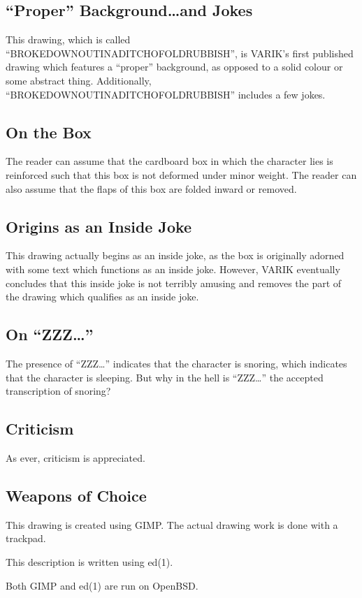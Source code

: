 \documentclass{report}
\begin{document}
\subsection{``Proper'' Background\ldots and Jokes}
This drawing, which is called ``BROKEDOWNOUTINADITCHOFOLDRUBBISH'', is VARIK's first published drawing which features a ``proper'' background, as opposed to a solid colour or some abstract thing.  Additionally, ``BROKEDOWNOUTINADITCHOFOLDRUBBISH'' includes a few jokes.

\subsection{On the Box}
The reader can assume that the cardboard box in which the character lies is reinforced such that this box is not deformed under minor weight.  The reader can also assume that the flaps of this box are folded inward or removed.

\subsection{Origins as an Inside Joke}
This drawing actually begins as an inside joke, as the box is originally adorned with some text which functions as an inside joke.  However, VARIK eventually concludes that this inside joke is not terribly amusing and removes the part of the drawing which qualifies as an inside joke.

\subsection{On ``ZZZ\ldots''}
The presence of ``ZZZ\ldots'' indicates that the character is snoring, which indicates that the character is sleeping.  But why in the hell is ``ZZZ\ldots'' the accepted transcription of snoring?

\subsection{Criticism}
As ever, criticism is appreciated.

\subsection{Weapons of Choice}
This drawing is created using GIMP\@.  The actual drawing work is done with a trackpad.

This description is written using ed(1).

Both GIMP and ed(1) are run on OpenBSD\@.
\end{document}
